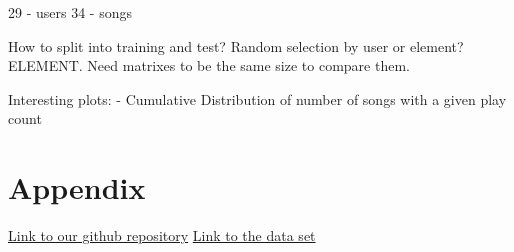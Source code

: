 \documentclass[12pt,preprint]{aastex}
\begin{document}
29 - users
34 - songs 

How to split into training and test? 
Random selection by user or element? ELEMENT. 
Need matrixes to be the same size to compare them.

Interesting plots:
- Cumulative Distribution of number of songs with a given play count


\section{Appendix}
\href{https://github.com/eringrand/musicanalysis}{Link to our github repository} 
\href{http://www.dtic.upf.edu/~ocelma/MusicRecommendationDataset/}{Link to the data set}
\end{document}
